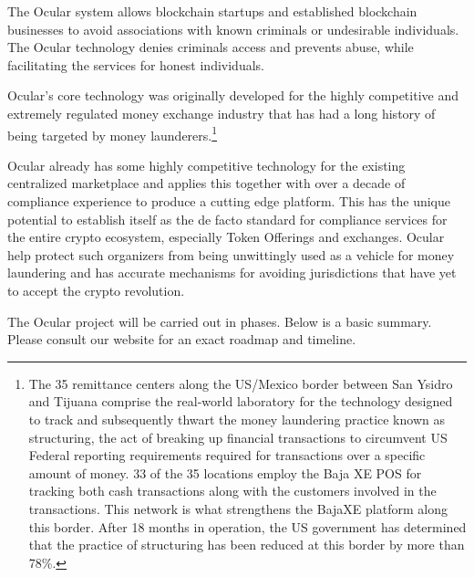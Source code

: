 \documentclass[12pt]{article}
\begin{document}
The Ocular system allows blockchain startups and established blockchain businesses to avoid associations with known criminals or undesirable individuals. The Ocular technology denies criminals access and prevents abuse, while facilitating the services for honest individuals. 

Ocular’s core technology was originally developed for the highly competitive and extremely regulated money exchange industry that has had a long history of being targeted by money launderers.\footnote{The 35 remittance centers along the US/Mexico border between San Ysidro and Tijuana comprise the real-world laboratory for the technology designed to track and subsequently thwart the money laundering practice known as structuring, the act of breaking up financial transactions to circumvent US Federal reporting requirements required for transactions over a specific amount
of money. 33 of the 35 locations employ the Baja XE POS for tracking both cash transactions along with the customers involved in the transactions. This network is what strengthens the BajaXE platform along this border. After 18 months in operation, the US government has determined that the practice of structuring has been reduced at this border by more than 78\%.}

Ocular already has some highly competitive technology for the existing centralized marketplace and applies this together with over a decade of compliance experience to produce a cutting edge platform. This has the unique potential to establish itself as the de facto standard for compliance services for the entire crypto ecosystem, especially Token Offerings and exchanges. Ocular help protect such organizers from being unwittingly used as a vehicle for money laundering and has accurate mechanisms for avoiding jurisdictions that have yet to accept the crypto revolution. 

The Ocular project will be carried out in phases. Below is a basic summary. Please consult our website for an exact roadmap and timeline.
\end{document}
